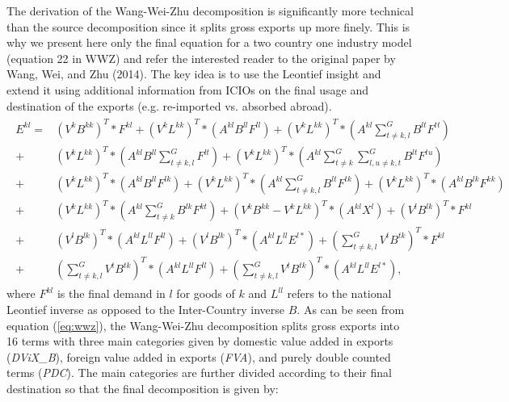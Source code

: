 \documentclass{article}
\begin{document}
The derivation of the Wang-Wei-Zhu decomposition is significantly more technical than the source decomposition since it splits gross exports up more finely. This is why we present here only the final equation for a two country one industry model (equation 22 in WWZ) and refer the interested reader to the original paper by Wang, Wei, and Zhu (2014). The key idea is to use the Leontief insight and extend it using additional information from ICIOs on the final usage and destination of the exports (e.g. re-imported vs. absorbed abroad).
\begin{align}
\label{eq:wwz}
\begin{split}
E^{kl}
= &\left(V^k B^{kk} \right)^T * F^{kl} 
+ \left(V^k L^{kk} \right)^T * \left(A^{kl} B^{ll} F^{ll} \right)
+  \left(V^k L^{kk} \right)^T * (A^{kl} \sum_{t \neq k,l}^G  B^{lt} F^{tt} )\\
+& \left(V^k L^{kk} \right)^T *  (A^{kl} B^{ll} \sum_{t \neq k,l}^G  F^{lt} ) 
+  \left(V^k L^{kk} \right)^T * (A^{kl} \sum_{t \neq k}^G \sum_{l,u \neq k,t}^G B^{lt} F^{tu} ) \\
+& \left(V^k L^{kk} \right)^T * \left(A^{kl} B^{ll} F^{lk} \right)
+ \left(V^k L^{kk} \right)^T * (A^{kl} \sum_{t \neq k,l}^G  B^{lt} F^{tk} )
+ \left(V^k L^{kk} \right)^T * \left(A^{kl} B^{lk} F^{kk} \right) \\
+& \left(V^k L^{kk} \right)^T * (A^{kl} \sum_{t \neq k}^G  B^{lk} F^{kt} )
+ \left(V^k B^{kk} -  V^k L^{kk} \right)^T * \left(A^{kl} X^{l}  \right)
+ \left(V^l B^{lk} \right)^T * F^{kl} \\
+& \left(V^l B^{lk} \right)^T *  \left(A^{kl} L^{ll} F^{ll} \right)
+ \left(V^l B^{lk} \right)^T *  \left(A^{kl} L^{ll} E^{l*} \right)
+ (\sum_{t \neq k,l}^G  V^{t} B^{tk} )^{T} * F^{kl} \\
+& (\sum_{t \neq k,l}^G  V^{t} B^{tk} )^{T} *  \left(A^{kl} L^{ll} F^{ll} \right)
+ (\sum_{t \neq k,l}^G  V^{t} B^{tk} )^{T} *  \left(A^{kl} L^{ll} E^{l*} \right) ,
\end{split}
\end{align}
where \(F^{kl}\) is the final demand in \(l\) for goods of \(k\) and \(L^{ll}\) refers to the national Leontief inverse as opposed to the Inter-Country inverse \(B\). As can be seen from equation (\ref{eq:wwz}), the Wang-Wei-Zhu decomposition splits gross exports into 16 terms with three main categories given by domestic value added in exports (\textit{DViX_B}), foreign value added in exports (\textit{FVA}), and purely double counted terms (\textit{PDC}). The main categories are further divided according to their final destination so that the final decomposition is given by:
\end{document}
